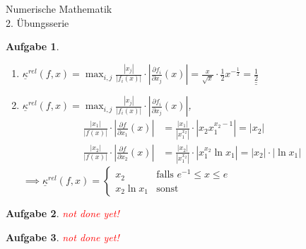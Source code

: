 \documentclass[11pt]{article}
\theoremstyle{break}
\newtheorem{task}{Aufgabe}
\newcommand{\abs}[1]{\ensuremath{\left\vert #1 \right\vert}}
\newcommand{\komp}{\ensuremath{\underline{\kappa}}}
\newcommand{\result}[1]{\ensuremath{\underline{\underline{#1}}}}
\newcommand{\ndy}{
    \textcolor{red} {\hfill not done yet!}
    \reversemarginpar
    \marginpar{\raggedleft\textcolor{red}{\rule{2mm}{2mm}}}
}
\newcommand{\hw}{2}
\begin{document}
\begin{center}
\Large{Numerische Mathematik}\\
\large{\hw. Übungsserie}
\end{center}
\begin{task}
    \hfill\vspace{-5mm}
    \begin{enumerate}[label={(\alph*)}]
        \item $\komp^{rel}(f,x) = \max_{i,j} \frac{\abs{x_j}}{\abs{f_i(x)}}\cdot\abs{\frac{\partial f_i}{\partial x_j}(x)} = \frac{x}{\sqrt{x}}\cdot \frac{1}{2} x^{-\frac{1}{2}}=\result{\frac{1}{2}}$
        \item $\komp^{rel}(f,x) = \max_{i,j} \frac{\abs{x_j}}{\abs{f_i(x)}}\cdot\abs{\frac{\partial f_i}{\partial x_j}(x)}$,
        \begin{align*}
            \frac{\abs{x_1}}{\abs{f(x)}}\cdot\abs{\frac{\partial f}{\partial x_1}(x)} &= \frac{\abs{x_1}}{\abs{x_1^{x_2}}}\cdot \abs{ x_2 x_1^{x_2 -1}}=\abs{x_2}\\
            \frac{\abs{x_2}}{\abs{f(x)}}\cdot\abs{\frac{\partial f}{\partial x_2}(x)} &= \frac{\abs{x_2}}{\abs{x_1^{x_2}}}\cdot \abs{ x_1^{x_2}\ln x_1}=\abs{x_2}\cdot\abs{\ln x_1}
        \end{align*}
        $\implies \komp^{rel}(f,x) = \begin{cases}
            x_2 & \text{falls } e^{-1} \leq x \leq e\\
            x_2\ln x_1 & \text{sonst}
        \end{cases}$
    \end{enumerate}
\end{task}
\begin{task}
    \ndy
\end{task}

\begin{task}
    \ndy
\end{task}
\end{document}
